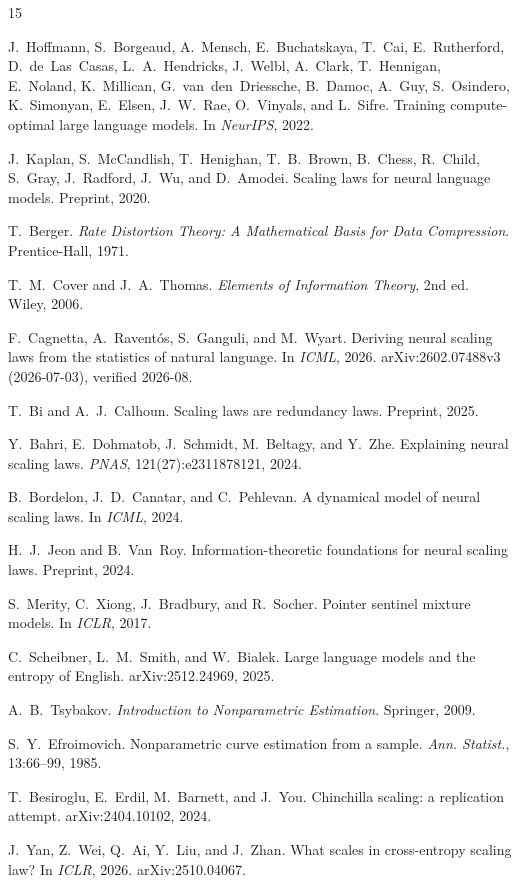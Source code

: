\documentclass[12pt]{article}
\theoremstyle{remark}
\begin{document}
\begin{thebibliography}{15}

J.~Hoffmann, S.~Borgeaud, A.~Mensch, E.~Buchatskaya, T.~Cai, E.~Rutherford,
D.~de~Las~Casas, L.~A.~Hendricks, J.~Welbl, A.~Clark, T.~Hennigan,
E.~Noland, K.~Millican, G.~van~den~Driessche, B.~Damoc, A.~Guy,
S.~Osindero, K.~Simonyan, E.~Elsen, J.~W.~Rae, O.~Vinyals, and
L.~Sifre.
Training compute-optimal large language models.
In \textit{NeurIPS}, 2022.

J.~Kaplan, S.~McCandlish, T.~Henighan, T.~B.~Brown, B.~Chess,
R.~Child, S.~Gray, J.~Radford, J.~Wu, and D.~Amodei.
Scaling laws for neural language models.
Preprint, 2020.

T.~Berger.
\textit{Rate Distortion Theory: A Mathematical Basis for Data Compression}.
Prentice-Hall, 1971.

T.~M.~Cover and J.~A.~Thomas.
\textit{Elements of Information Theory}, 2nd ed.
Wiley, 2006.

F.~Cagnetta, A.~Ravent\'os, S.~Ganguli, and M.~Wyart.
Deriving neural scaling laws from the statistics of natural language.
In \textit{ICML}, 2026. arXiv:2602.07488v3 (2026-07-03), verified 2026-08.

T.~Bi and A.~J.~Calhoun.
Scaling laws are redundancy laws.
Preprint, 2025.

Y.~Bahri, E.~Dohmatob, J.~Schmidt, M.~Beltagy, and Y.~Zhe.
Explaining neural scaling laws.
\textit{PNAS}, 121(27):e2311878121, 2024.

B.~Bordelon, J.~D.~Canatar, and C.~Pehlevan.
A dynamical model of neural scaling laws.
In \textit{ICML}, 2024.

H.~J.~Jeon and B.~Van~Roy.
Information-theoretic foundations for neural scaling laws.
Preprint, 2024.

S.~Merity, C.~Xiong, J.~Bradbury, and R.~Socher.
Pointer sentinel mixture models.
In \textit{ICLR}, 2017.

C.~Scheibner, L.~M.~Smith, and W.~Bialek.
Large language models and the entropy of English.
arXiv:2512.24969, 2025.

A.~B.~Tsybakov.
\textit{Introduction to Nonparametric Estimation}.
Springer, 2009.

S.~Y.~Efroimovich.
Nonparametric curve estimation from a sample.
\textit{Ann. Statist.}, 13:66--99, 1985.

T.~Besiroglu, E.~Erdil, M.~Barnett, and J.~You.
Chinchilla scaling: a replication attempt.
arXiv:2404.10102, 2024.

J.~Yan, Z.~Wei, Q.~Ai, Y.~Liu, and J.~Zhan.
What scales in cross-entropy scaling law?
In \textit{ICLR}, 2026. arXiv:2510.04067.

\end{thebibliography}
\end{document}
